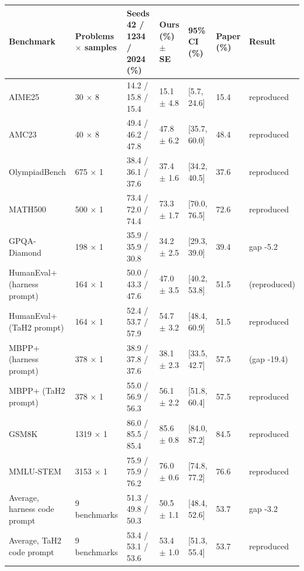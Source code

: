 \begin{tabular}{lllllll}
\toprule
Benchmark & Problems $\times$ samples & Seeds 42 / 1234 / 2024 (\%) & Ours (\%) $\pm$ SE & 95\% CI (\%) & Paper (\%) & Result \\
\midrule
AIME25 & 30 $\times$ 8 & 14.2 / 15.8 / 15.4 & 15.1 $\pm$ 4.8 & [5.7, 24.6] & 15.4 & reproduced \\
AMC23 & 40 $\times$ 8 & 49.4 / 46.2 / 47.8 & 47.8 $\pm$ 6.2 & [35.7, 60.0] & 48.4 & reproduced \\
OlympiadBench & 675 $\times$ 1 & 38.4 / 36.1 / 37.6 & 37.4 $\pm$ 1.6 & [34.2, 40.5] & 37.6 & reproduced \\
MATH500 & 500 $\times$ 1 & 73.4 / 72.0 / 74.4 & 73.3 $\pm$ 1.7 & [70.0, 76.5] & 72.6 & reproduced \\
GPQA-Diamond & 198 $\times$ 1 & 35.9 / 35.9 / 30.8 & 34.2 $\pm$ 2.5 & [29.3, 39.0] & 39.4 & gap -5.2 \\
HumanEval+ (harness prompt) & 164 $\times$ 1 & 50.0 / 43.3 / 47.6 & 47.0 $\pm$ 3.5 & [40.2, 53.8] & 51.5 & (reproduced) \\
HumanEval+ (TaH2 prompt) & 164 $\times$ 1 & 52.4 / 53.7 / 57.9 & 54.7 $\pm$ 3.2 & [48.4, 60.9] & 51.5 & reproduced \\
MBPP+ (harness prompt) & 378 $\times$ 1 & 38.9 / 37.8 / 37.6 & 38.1 $\pm$ 2.3 & [33.5, 42.7] & 57.5 & (gap -19.4) \\
MBPP+ (TaH2 prompt) & 378 $\times$ 1 & 55.0 / 56.9 / 56.3 & 56.1 $\pm$ 2.2 & [51.8, 60.4] & 57.5 & reproduced \\
GSM8K & 1319 $\times$ 1 & 86.0 / 85.5 / 85.4 & 85.6 $\pm$ 0.8 & [84.0, 87.2] & 84.5 & reproduced \\
MMLU-STEM & 3153 $\times$ 1 & 75.9 / 75.9 / 76.2 & 76.0 $\pm$ 0.6 & [74.8, 77.2] & 76.6 & reproduced \\
\midrule
Average, harness code prompt & 9 benchmarks & 51.3 / 49.8 / 50.3 & 50.5 $\pm$ 1.1 & [48.4, 52.6] & 53.7 & gap -3.2 \\
Average, TaH2 code prompt & 9 benchmarks & 53.4 / 53.1 / 53.6 & 53.4 $\pm$ 1.0 & [51.3, 55.4] & 53.7 & reproduced \\
\bottomrule
\end{tabular}
